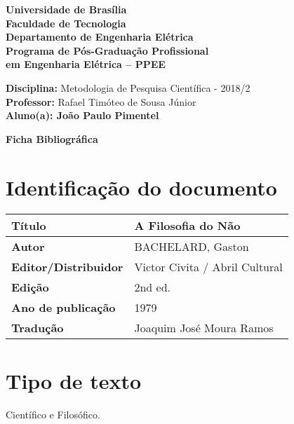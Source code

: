 \documentclass[11pt]{article}
\begin{document}
\noindent
\begin{center}
\Large\textbf{Universidade de Brasília}\\
\Large\textbf{Faculdade de Tecnologia}\\
\Large\textbf{Departamento de Engenharia Elétrica}\\
\Large\textbf{Programa de Pós-Graduação Profissional \\
	em Engenharia Elétrica -- PPEE}\\
\end{center}

\large{
\noindent
\textbf{Disciplina:} Metodologia de Pesquisa Científica - 2018/2\\
\textbf{Professor:} Rafael Timóteo de Sousa Júnior \\
\textbf{Aluno(a): João Paulo Pimentel}}\\

\begin{center}
\Large\textbf{Ficha Bibliográfica}
\end{center}
\normalsize

\section{Identificação do documento}
\begin{center}
	\begin{tabular}{|l|l|} \hline
		\textbf{Título} & A Filosofia do Não\cite{Bachelard1979} \\ \hline
		\textbf{Autor} & BACHELARD, Gaston \\ \hline
		\textbf{Editor/Distribuidor} & Victor Civita / Abril Cultural
 \\ \hline
		\textbf{Edição} & 2nd ed. \\ \hline
		\textbf{Ano de publicação} & 1979 \\ \hline
		\textbf{Tradução} &  Joaquim José Moura Ramos \\ \hline
	\end{tabular}
\end{center}

\section{Tipo de texto}

    \paragraph{}
    Científico e Filosófico.
\end{document}
